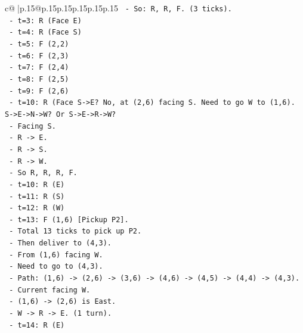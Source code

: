\documentclass{article}
\begin{document}
{\begin{supertabular}{c@{$\;$}|p{.15\linewidth}@{}p{.15\linewidth}p{.15\linewidth}p{.15\linewidth}p{.15\linewidth}p{.15\linewidth}}
{{{\texttt{                  {-} So: R, R, F. (3 ticks).} \\
\texttt{                  {-} t=3: R (Face E)} \\
\texttt{                  {-} t=4: R (Face S)} \\
\texttt{                  {-} t=5: F (2,2)} \\
\texttt{                  {-} t=6: F (2,3)} \\
\texttt{                  {-} t=7: F (2,4)} \\
\texttt{                  {-} t=8: F (2,5)} \\
\texttt{                  {-} t=9: F (2,6)} \\
\texttt{                  {-} t=10: R (Face S{-}>E? No, at (2,6) facing S. Need to go W to (1,6). S{-}>E{-}>N{-}>W? Or S{-}>E{-}>R{-}>W?} \\
\texttt{                    {-} Facing S.} \\
\texttt{                    {-} R {-}> E.} \\
\texttt{                    {-} R {-}> S.} \\
\texttt{                    {-} R {-}> W.} \\
\texttt{                    {-} So R, R, R, F.} \\
\texttt{                    {-} t=10: R (E)} \\
\texttt{                    {-} t=11: R (S)} \\
\texttt{                    {-} t=12: R (W)} \\
\texttt{                    {-} t=13: F (1,6) {[}Pickup P2{]}.} \\
\texttt{                {-} Total 13 ticks to pick up P2.} \\
\texttt{                {-} Then deliver to (4,3).} \\
\texttt{                {-} From (1,6) facing W.} \\
\texttt{                {-} Need to go to (4,3).} \\
\texttt{                {-} Path: (1,6) {-}> (2,6) {-}> (3,6) {-}> (4,6) {-}> (4,5) {-}> (4,4) {-}> (4,3).} \\
\texttt{                {-} Current facing W.} \\
\texttt{                {-} (1,6) {-}> (2,6) is East.} \\
\texttt{                {-} W {-}> R {-}> E. (1 turn).} \\
\texttt{                {-} t=14: R (E)} \\
}}}
\end{supertabular}}
\end{document}
